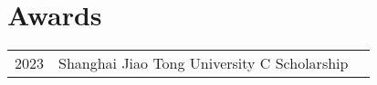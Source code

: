 \documentclass[]{deedy-resume-openfont}
\begin{document}
\begin{minipage}[t]{0.73\textwidth}


\section{Awards} 
\begin{tabular}{rll}
2023         & Shanghai Jiao Tong University C Scholarship \\\end{tabular}
\sectionsep


% 
% 

\end{minipage} 
\end{document}
